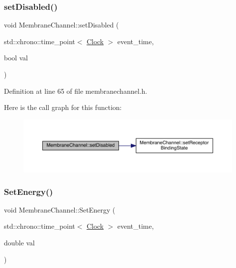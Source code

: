 \mbox{\label{class_membrane_channel_aed2055857888506a35c09bdcc265799a}} 
\subsubsection{\texorpdfstring{set\+Disabled()}{setDisabled()}}
{\footnotesize\ttfamily void Membrane\+Channel\+::set\+Disabled (\begin{DoxyParamCaption}\item[{std\+::chrono\+::time\+\_\+point$<$ \hyperlink{universe_8h_a0ef8d951d1ca5ab3cfaf7ab4c7a6fd80}{Clock} $>$}]{event\+\_\+time,  }\item[{bool}]{val }\end{DoxyParamCaption})\hspace{0.3cm}{\ttfamily [inline]}}



Definition at line 65 of file membranechannel.\+h.

Here is the call graph for this function\+:\nopagebreak
\begin{figure}[H]
\begin{center}
\leavevmode
\includegraphics[width=350pt]{class_membrane_channel_aed2055857888506a35c09bdcc265799a_cgraph}
\end{center}
\end{figure}
\mbox{\label{class_membrane_channel_aaa2d816d3887b6292d995a83130a4834}} 
\subsubsection{\texorpdfstring{Set\+Energy()}{SetEnergy()}}
{\footnotesize\ttfamily void Membrane\+Channel\+::\+Set\+Energy (\begin{DoxyParamCaption}\item[{std\+::chrono\+::time\+\_\+point$<$ \hyperlink{universe_8h_a0ef8d951d1ca5ab3cfaf7ab4c7a6fd80}{Clock} $>$}]{event\+\_\+time,  }\item[{double}]{val }\end{DoxyParamCaption})\hspace{0.3cm}{\ttfamily [inline]}}



